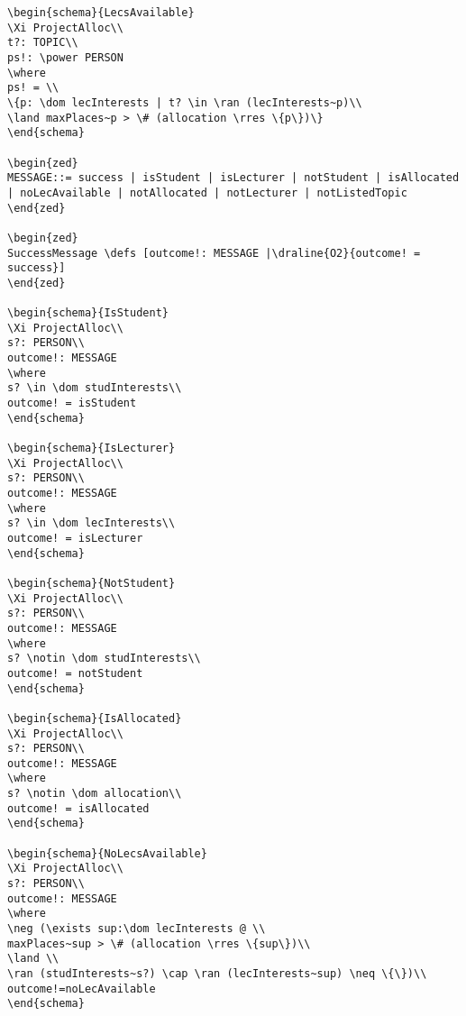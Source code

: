 \begin{verbatim}
\begin{schema}{LecsAvailable}
\Xi ProjectAlloc\\
t?: TOPIC\\
ps!: \power PERSON
\where
ps! = \\
\{p: \dom lecInterests | t? \in \ran (lecInterests~p)\\
\land maxPlaces~p > \# (allocation \rres \{p\})\}
\end{schema}

\begin{zed}
MESSAGE::= success | isStudent | isLecturer | notStudent | isAllocated | noLecAvailable | notAllocated | notLecturer | notListedTopic
\end{zed}

\begin{zed}
SuccessMessage \defs [outcome!: MESSAGE |\draline{O2}{outcome! = success}]
\end{zed}

\begin{schema}{IsStudent}
\Xi ProjectAlloc\\
s?: PERSON\\
outcome!: MESSAGE
\where
s? \in \dom studInterests\\
outcome! = isStudent
\end{schema}

\begin{schema}{IsLecturer}
\Xi ProjectAlloc\\
s?: PERSON\\
outcome!: MESSAGE
\where
s? \in \dom lecInterests\\
outcome! = isLecturer
\end{schema}

\begin{schema}{NotStudent}
\Xi ProjectAlloc\\
s?: PERSON\\
outcome!: MESSAGE
\where
s? \notin \dom studInterests\\
outcome! = notStudent
\end{schema}

\begin{schema}{IsAllocated}
\Xi ProjectAlloc\\
s?: PERSON\\
outcome!: MESSAGE
\where
s? \notin \dom allocation\\
outcome! = isAllocated
\end{schema}

\begin{schema}{NoLecsAvailable}
\Xi ProjectAlloc\\
s?: PERSON\\
outcome!: MESSAGE
\where
\neg (\exists sup:\dom lecInterests @ \\
maxPlaces~sup > \# (allocation \rres \{sup\})\\
\land \\
\ran (studInterests~s?) \cap \ran (lecInterests~sup) \neq \{\})\\
outcome!=noLecAvailable
\end{schema}


\end{verbatim}
